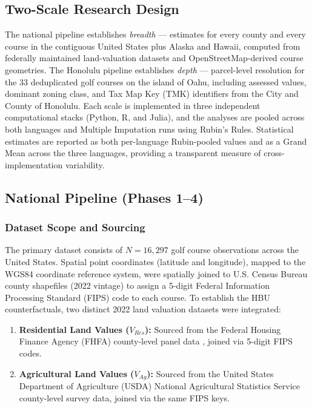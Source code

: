 \documentclass[11pt, letterpaper]{article}
\begin{document}
\subsection{Two-Scale Research Design}

The national pipeline establishes \textit{breadth} --- estimates for every county and every course in the contiguous United States plus Alaska and Hawaii, computed from federally maintained land-valuation datasets and OpenStreetMap-derived course geometries. The Honolulu pipeline establishes \textit{depth} --- parcel-level resolution for the 33 deduplicated golf courses on the island of Oahu, including assessed values, dominant zoning class, and Tax Map Key (TMK) identifiers from the City and County of Honolulu. Each scale is implemented in three independent computational stacks (Python, R, and Julia), and the analyses are pooled across both languages and Multiple Imputation runs using Rubin's Rules. Statistical estimates are reported as both per-language Rubin-pooled values and as a Grand Mean across the three languages, providing a transparent measure of cross-implementation variability.

\subsection{National Pipeline (Phases 1--4)}

\subsubsection{Dataset Scope and Sourcing}

The primary dataset consists of $N = 16{,}297$ golf course observations across the United States. Spatial point coordinates (latitude and longitude), mapped to the WGS84 coordinate reference system, were spatially joined to U.S. Census Bureau county shapefiles (2022 vintage) to assign a 5-digit Federal Information Processing Standard (FIPS) code to each course. To establish the HBU counterfactuals, two distinct 2022 land valuation datasets were integrated:

\begin{enumerate}[leftmargin=*]
    \item \textbf{Residential Land Values ($V_{Res}$):} Sourced from the Federal Housing Finance Agency (FHFA) county-level panel data \parencite{Davis2021}, joined via 5-digit FIPS codes.
    \item \textbf{Agricultural Land Values ($V_{Ag}$):} Sourced from the United States Department of Agriculture (USDA) National Agricultural Statistics Service county-level survey data, joined via the same FIPS keys.
\end{enumerate}
\end{document}
